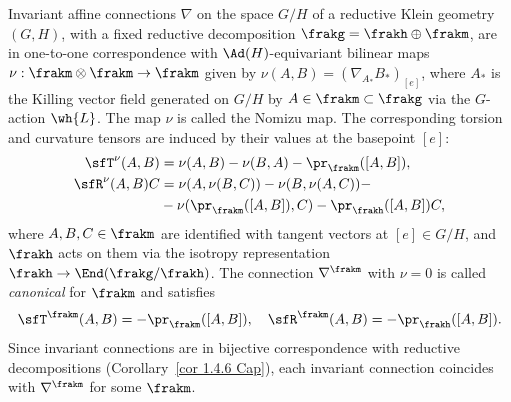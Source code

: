 \begin{cor}[Wang]
    Invariant affine connections $\nabla$ on the space $G\slash H$ of a reductive Klein geometry $(G,H)$, with a fixed reductive decomposition $\frakg=\frakh\oplus\frakm$, are in one-to-one correspondence with $\Ad(H)$-equivariant bilinear maps $\nu:\frakm\otimes\frakm\to \frakm$ given by $\nu(A,B)=(\nabla_{A_\ast}B_\ast)_{[e]}$, where $A_\ast$ is the Killing vector field generated on $G\slash H$ by $A\in\frakm\subset\frakg$ via the $G$-action $\wh{L}$. The map $\nu$ is called the Nomizu map. The corresponding torsion and curvature tensors are induced by their values at the basepoint $[e]$:
    \begin{align}
        \sfT^\nu(A,B)&=\nu(A,B)-\nu(B,A)-\pr_{\frakm}([A,B]),\\
        \sfR^\nu(A,B)C&=\nu(A,\nu(B,C))-\nu(B,\nu(A,C))-\\
        &-\nu(\pr_\frakm([A,B]),C)-\pr_\frakh([A,B])C,\label{eq nomizu curvature}
    \end{align}
    where $A,B,C\in\frakm$ are identified with tangent vectors at $[e]\in G\slash H$, and $\frakh$ acts on them via the isotropy representation $\frakh\to\End(\frakg\slash\frakh)$. The connection $\nabla^\frakm$ with $\nu=0$ is called \emph{canonical} for $\frakm$ and satisfies 
    \[\sfT^\frakm(A,B)=-\pr_\frakm([A,B]),\quad \sfR^\frakm(A,B)=-\pr_\frakh([A,B]).\]
    Since invariant connections are in bijective correspondence with reductive decompositions (Corollary~\ref{cor 1.4.6 Cap}), each invariant connection coincides with $\nabla^\frakm$ for some $\frakm$.
\end{cor}


